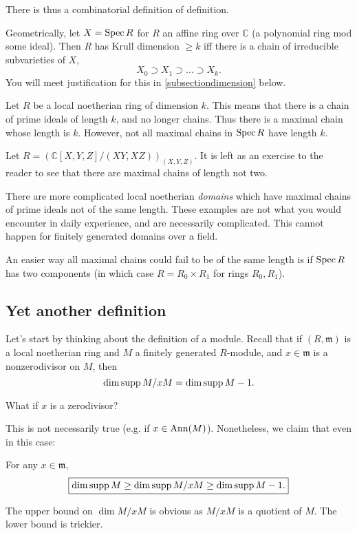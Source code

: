There is thus a combinatorial definition of definition.

Geometrically, let $X = \operatorname{Spec} R$ for $R$ an affine ring over $\mathbb{C}$ (a
polynomial ring mod some ideal). Then $R$ has Krull dimension $\geq k$ iff there is a
chain of irreducible subvarieties of $X$,
\[ X_0 \supset X_1 \supset \dots \supset X_k . \]
You will meet justification for this in \cref{subsectiondimension} below.

\begin{remark} Let $R$ be a local noetherian ring of dimension $k$. This
means that there is a chain of prime ideals of length $k$, and no longer
chains. Thus there is a maximal chain whose length is $k$. However, not all
maximal chains in $\operatorname{Spec} R$ have length $k$. 
\end{remark} 

\begin{example} 
Let $R =( \mathbb{C}[X,Y,Z]/(XY,XZ))_{(X,Y,Z)}$. It is left as an
exercise to the reader to see that there are maximal chains of
length not two.

There are more complicated local noetherian \emph{domains} which have maximal
chains of prime ideals not of the same length. These examples are not what you
would encounter in daily experience, and are necessarily complicated. This
cannot happen for finitely generated domains over a field.
\end{example} 

\begin{example} 
An easier way all maximal chains could fail to be of the same length is if
$\operatorname{Spec} R$ has two components (in which case $R = R_0 \times R_1$ for rings
$R_0, R_1$). 
\end{example} 


\subsection{Yet another definition}
Let's start by thinking about the definition of a module. Recall that if $(R,
\mathfrak{m})$ is
a local noetherian ring and $M$ a finitely generated $R$-module, and $x \in \mathfrak{m}$ is
a nonzerodivisor on $M$, then
\[ \dim \operatorname{supp} M/xM = \dim \operatorname{supp} M -1.  \]

\begin{question} 
What if $x$ is  a zerodivisor? 
\end{question} 

This is not necessarily true (e.g. if $x \in \operatorname{Ann}(M)$). Nonetheless, we claim
that even in this case:
\begin{proposition} 
For any $x \in \mathfrak{m}$,
\[ \boxed{ \dim \operatorname{supp} M \geq \dim \operatorname{supp} M/xM \geq \dim \operatorname{supp} M -1 .}\]
\end{proposition} 
The upper bound on $\dim M/xM$ is obvious as $M/xM$ is a quotient of $M$. The
lower bound is trickier. 

